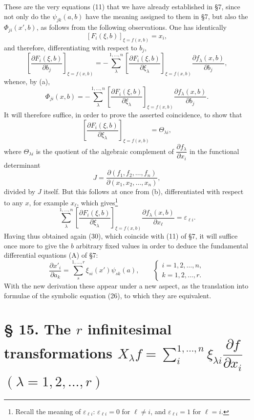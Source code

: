 \documentclass[11pt]{book}
\begin{document}
These are the very equations (11) that we have already established in \S{}7, since not only do the $\psi_{jk}(a,b)$ have the meaning assigned to them in \S{}7, but also the $\Phi_{ji}(x',b)$, as follows from the following observations. One has identically
\begin{equation*}\tag{b}
 \left[F_i(\xi,b)\right]_{\xi=f(x,b)}=x_i,
\end{equation*}
and therefore, differentiating with respect to $b_j$,
\[
 \left[\frac{\partial F_i(\xi,b)}{\partial b_j}\right]_{\xi=f(x,b)}
 =-\sum\limits_\lambda^{1,\ldots,n}\left[\frac{\partial F_i(\xi,b)}{\partial\xi_\lambda}\right]_{\xi=f(x,b)}
 \frac{\partial f_\lambda(x,b)}{\partial b_j},
\]
whence, by (a),
\[
 \Phi_{ji}(x,b)= -\sum\limits_\lambda^{1,\ldots,n}\left[\frac{\partial F_i(\xi,b)}{\partial\xi_\lambda}\right]_{\xi=f(x,b)}
 \frac{\partial f_\lambda(x,b)}{\partial b_j}.
\]
It will therefore suffice, in order to prove the asserted coincidence, to show that
\[
 \left[\frac{\partial F_i(\xi,b)}{\partial\xi_\lambda}\right]_{\xi=f(x,b)}=\Theta_{\lambda i},
\]
where $\Theta_{\lambda i}$ is the quotient of the algebraic complement of $\dfrac{\partial f_\lambda}{\partial x_i}$ in the functional determinant
\[
 J=\frac{\partial(f_1,f_2,\ldots,f_n)}{\partial(x_1,x_2,\ldots,x_n)},
\]
divided by $J$ itself. But this follows at once from (b), differentiated with respect to any $x$, for example $x_\ell$, which gives\footnote{Recall the meaning of $\varepsilon_{\ell i}$: $\varepsilon_{\ell i}=0$ for $\ell\ne i$, and $\varepsilon_{\ell i}=1$ for $\ell=i$.}
\[
 \sum\limits_\lambda^{1,\ldots,n}\left[\frac{\partial F_i(\xi,b)}{\partial\xi_\lambda}\right]_{\xi=f(x,b)}
 \frac{\partial f_\lambda(x,b)}{\partial x_\ell}=\varepsilon_{\ell i}.
\]
Having thus obtained again (30), which coincide with (11) of \S{}7, it will suffice once more to give the $b$ arbitrary fixed values in order to deduce the fundamental differential equations (A) of \S{}7:
\begin{equation*}\tag{A}
 \frac{\partial x'_i}{\partial a_k}=\sum\limits_s^{1,\ldots,r}\xi_{si}(x')\psi_{sk}(a),
 \qquad
 \begin{cases}
 i=1,2,\ldots,n,\\
 k=1,2,\ldots,r.
 \end{cases}
\end{equation*}
With the new derivation these appear under a new aspect, as the translation into formulae of the symbolic equation (26), to which they are equivalent.

\section*{\S{} 15. The $r$ infinitesimal transformations $X_\lambda f=\sum\limits_i^{1,\ldots,n} \xi_{\lambda i}\dfrac{\partial f}{\partial x_i}$ $(\lambda=1,2,\ldots,r)$}
\end{document}

